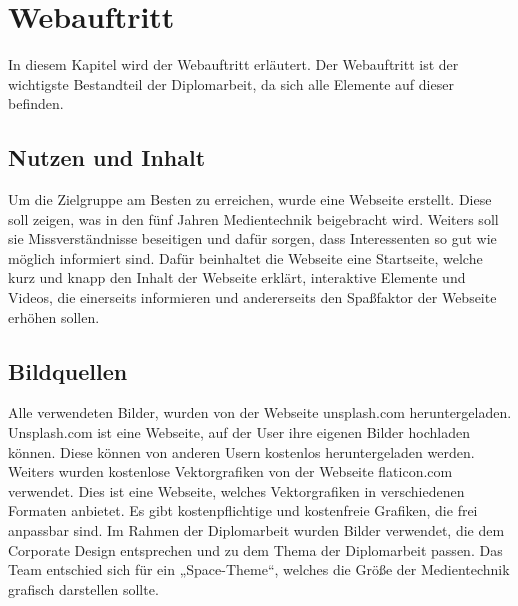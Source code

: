 \chapter{Webauftritt}
\renewcommand{\kapitelautor}{Autor: Hatice Akyokus}
In diesem Kapitel wird der Webauftritt erläutert. Der Webauftritt ist der wichtigste Bestandteil der Diplomarbeit, da sich alle Elemente auf dieser befinden.
 
\section{Nutzen und Inhalt}
Um die Zielgruppe am Besten zu erreichen, wurde eine Webseite erstellt. Diese soll zeigen, was in den fünf Jahren Medientechnik beigebracht wird. Weiters soll sie Missverständnisse beseitigen und dafür sorgen, dass Interessenten so gut wie möglich informiert sind. Dafür beinhaltet die Webseite eine Startseite, welche kurz und knapp den Inhalt der Webseite erklärt, interaktive Elemente und Videos, die einerseits informieren und andererseits den Spaßfaktor der Webseite erhöhen sollen. 

\section{Bildquellen}
Alle verwendeten Bilder, wurden von der Webseite unsplash.com heruntergeladen. Unsplash.com ist eine Webseite, auf der User ihre eigenen Bilder hochladen können. Diese können von anderen Usern kostenlos heruntergeladen werden. Weiters wurden kostenlose Vektorgrafiken von der Webseite flaticon.com verwendet. Dies ist eine Webseite, welches Vektorgrafiken in verschiedenen Formaten anbietet. Es gibt kostenpflichtige und kostenfreie Grafiken, die frei anpassbar sind. Im Rahmen der Diplomarbeit wurden Bilder verwendet, die dem Corporate Design entsprechen und zu dem Thema der Diplomarbeit passen. Das Team entschied sich für ein „Space-Theme“, welches die Größe der Medientechnik grafisch darstellen sollte. 

